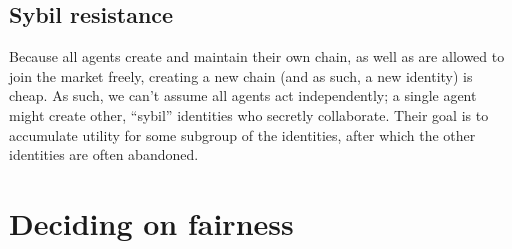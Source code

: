 \subsection{Sybil resistance}
Because all agents create and maintain their own chain, as well as are allowed to join the market freely, creating a new chain (and as such, a new identity) is cheap. As such, we can't assume all agents act independently; a single agent might create other, ``sybil'' identities who secretly collaborate. Their goal is to accumulate utility for some subgroup of the identities, after which the other identities are often abandoned.

\section{Deciding on fairness}
